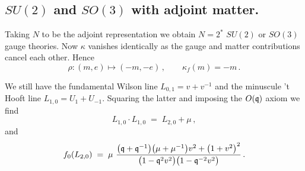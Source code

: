 \documentclass[12pt]{amsart}
\begin{document}
\subsection{$SU(2)$ and $SO(3)$ with adjoint matter.}
Taking $N$ to be the adjoint representation we obtain $N=2^*$ $SU(2)$ or $SO(3)$ gauge theories. 
Now $\kappa$ vanishes identically as the gauge and matter contributions cancel each other. Hence
\begin{equation}
	\rho : (m,e) \longmapsto (-m,-e) \,,\qquad \kappa_f(m) = -m \,.
\end{equation}

We still have the fundamental Wilson line $L_{0,1} = v + v^{-1}$ and the minuscule 't Hooft line $L_{1,0} = U_1 + U_{-1}$.
Squaring the latter and imposing the $O(\mathfrak{q})$ axiom we find 
\begin{equation}\label{eq:adjsquare}
	L_{1,0}\cdot L_{1,0} \;=\; L_{2,0} + \mu \,,
\end{equation}
and 
\begin{equation}\label{eq:adjbubble}
	f_0(L_{2,0}) \;=\; \mu\ \frac{\big(\fq+\fq^{-1}\big)\big(\mu+\mu^{-1}\big)v^{2}
	                     + \big(1+v^{2}\big)^{2}}
	                    {\big(1-\fq^{2}v^{2}\big)\big(1-\fq^{-2}v^{2}\big)} \,.
\end{equation}
\end{document}
